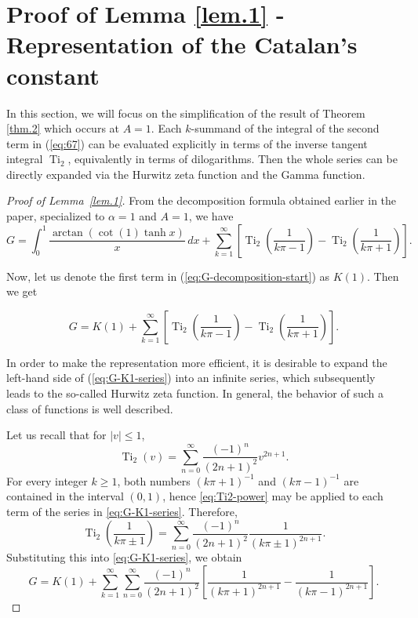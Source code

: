 \documentclass[preprint,12pt,nopreprintline]{elsarticle}
\begin{document}
\section{Proof of Lemma \ref{lem.1} - Representation of the Catalan’s constant}

In this section, we will focus on the simplification of the result of Theorem \ref{thm.2} which occurs at $A=1$. Each $k$-summand of the integral of the second term in (\ref{eq:67}) can be evaluated explicitly in terms of the inverse tangent integral $\operatorname{Ti}_2$, equivalently in terms of dilogarithms. Then the whole series can be directly expanded via the Hurwitz zeta function and the Gamma function.  

\begin{proof}[Proof of Lemma~\ref{lem.1}]\normalfont

From the decomposition formula obtained earlier in the paper, specialized to $\alpha=1$ and $A=1$, we have
\begin{equation}\label{eq:G-decomposition-start}
G
=
\int_0^1 \frac{\arctan(\cot(1)\tanh x)}{x}\,dx
+
\sum_{k=1}^{\infty}
\left[
\operatorname{Ti}_2\!\left(\frac{1}{k\pi-1}\right)
-
\operatorname{Ti}_2\!\left(\frac{1}{k\pi+1}\right)
\right].
\end{equation}

Now, let us denote the first term in (\ref{eq:G-decomposition-start}) as $K\left(1\right)$. Then we get

\begin{equation}\label{eq:G-K1-series}
G
=
K(1)
+
\sum_{k=1}^{\infty}
\left[
\operatorname{Ti}_2\!\left(\frac{1}{k\pi-1}\right)
-
\operatorname{Ti}_2\!\left(\frac{1}{k\pi+1}\right)
\right].
\end{equation}

In order to make the representation more efficient, it is desirable to expand the left-hand side of (\ref{eq:G-K1-series}) into an infinite series, which subsequently leads to the so-called Hurwitz zeta function. In general, the behavior of such a class of functions is well described.

Let us recall that for $|v|\le 1$,
\begin{equation}\label{eq:Ti2-power}
\operatorname{Ti}_2(v)=\sum_{n=0}^{\infty}\frac{(-1)^n}{(2n+1)^2}v^{2n+1}.
\end{equation}
For every integer $k\ge 1$, both numbers $(k\pi+1)^{-1}$ and $(k\pi-1)^{-1}$ are contained in the interval $(0,1)$, hence \eqref{eq:Ti2-power} may be applied to each term of the series in \eqref{eq:G-K1-series}. Therefore,
\[
\operatorname{Ti}_2\!\left(\frac{1}{k\pi\pm 1}\right)
=
\sum_{n=0}^{\infty}
\frac{(-1)^n}{(2n+1)^2}\frac{1}{(k\pi\pm 1)^{2n+1}}.
\]
Substituting this into \eqref{eq:G-K1-series}, we obtain
\begin{equation}\label{eq:G-double-series}
G
=
K(1)
+
\sum_{k=1}^{\infty}
\sum_{n=0}^{\infty}
\frac{(-1)^n}{(2n+1)^2}
\left[
\frac{1}{(k\pi+1)^{2n+1}}
-
\frac{1}{(k\pi-1)^{2n+1}}
\right].
\end{equation}


\end{proof}
\end{document}
